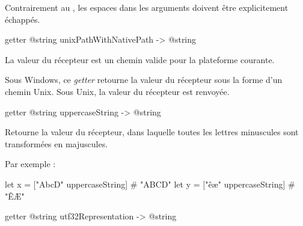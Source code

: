 Contrairement au , les espaces dans les arguments doivent être explicitement échappés.





\begin{galgas3box}
getter @string unixPathWithNativePath -> @string
\end{galgas3box}

La valeur du récepteur est un chemin valide pour la plateforme courante.

Sous Windows, ce \emph{getter} retourne la valeur du récepteur sous la forme d'un chemin Unix. Sous Unix, la valeur du récepteur est renvoyée.














\begin{galgas3box}
getter @string uppercaseString -> @string
\end{galgas3box}

Retourne la valeur du récepteur, dans laquelle toutes les lettres minuscules sont transformées en majuscules.

Par exemple :
\begin{galgas3}
let x = ["AbcD" uppercaseString] # "ABCD"
let y = ["êæ" uppercaseString] # "ÊÆ"
\end{galgas3}















\begin{galgas3box}
getter @string utf32Representation -> @string
\end{galgas3box}
















